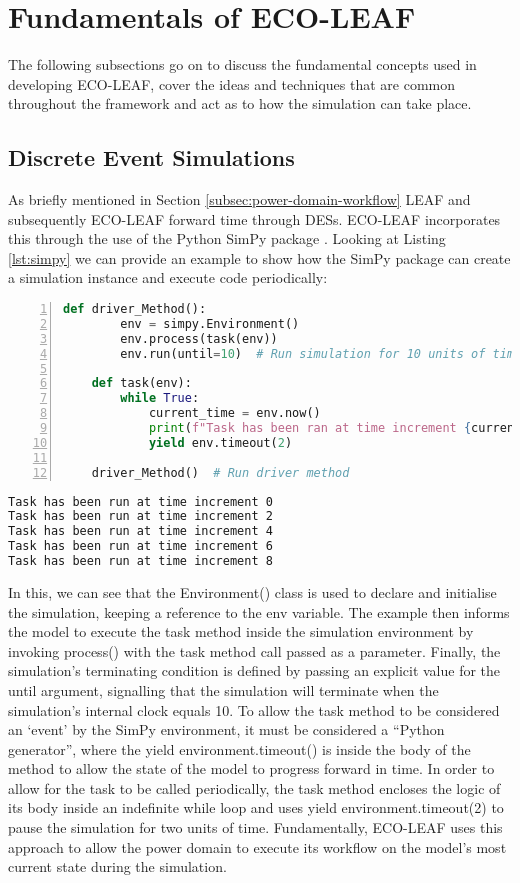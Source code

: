 \documentclass{l4proj}
\begin{document}
\section{Fundamentals of ECO-LEAF}
The following subsections go on to discuss the fundamental concepts used in developing ECO-LEAF, cover the ideas and techniques that are common throughout the framework and act as to how the simulation can take place.

\subsection{Discrete Event Simulations}\label{imp:subsec:des}
As briefly mentioned in Section \ref{subsec:power-domain-workflow} LEAF and subsequently ECO-LEAF forward time through DESs.
ECO-LEAF incorporates this through the use of the Python SimPy package \citep{simpy}.
Looking at Listing \ref{lst:simpy} we can provide an example to show how the SimPy package can create a simulation instance and execute code periodically:
\begin{lstlisting}[language=python, numbers=left, caption={Example use of the SimPy environment}, label=lst:simpy]
    def driver_Method():
        env = simpy.Environment()
        env.process(task(env))
        env.run(until=10)  # Run simulation for 10 units of time

    def task(env):
        while True:
            current_time = env.now()
            print(f"Task has been ran at time increment {current_time}")
            yield env.timeout(2)

    driver_Method()  # Run driver method
\end{lstlisting}
\begin{lstlisting}[language=TeX, caption={Terminal output of Listing \ref{lst:simpy}}, label=lst:simpy-output]
Task has been run at time increment 0
Task has been run at time increment 2
Task has been run at time increment 4
Task has been run at time increment 6
Task has been run at time increment 8
\end{lstlisting}

In this, we can see that the Environment() class is used to declare and initialise the simulation, keeping a reference to the env variable.
The example then informs the model to execute the task method inside the simulation environment by invoking process() with the task method call passed as a parameter.
Finally, the simulation's terminating condition is defined by passing an explicit value for the until argument, signalling that the simulation will terminate when the simulation's internal clock equals 10.
To allow the task method to be considered an `event' by the SimPy environment, it must be considered a ``Python generator'', where the yield environment.timeout() is inside the body of the method to allow the state of the model to progress forward in time.
In order to allow for the task to be called periodically, the task method encloses the logic of its body inside an indefinite while loop and uses yield environment.timeout(2) to pause the simulation for two units of time.
Fundamentally, ECO-LEAF uses this approach to allow the power domain to execute its workflow on the model's most current state during the simulation.
\end{document}
